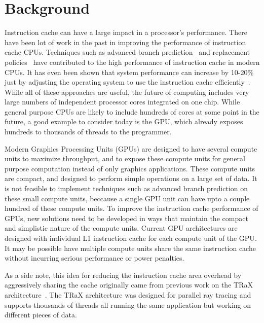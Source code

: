 \section{Background}

Instruction cache can have a large impact in a processor's
performance. 
There have been lot of work in the past in improving the performance
of instruction cache  CPUs. 
Techniques such as advanced branch prediction~\cite{yeh93} and
replacement policies~\cite{smith85} have contributed to the high
performance of instruction cache in modern CPUs. 
It has even been shown that system performance can increase by 10-20\%
just by adjusting the operating system to use the instruction cache
efficiently~\cite{torrellas98}.
While all of these approaches are useful, the future of computing
includes very large numbers of independent processor cores integrated
on one chip.
While general purpose CPUs are likely to include hundreds of cores at
some point in the future, a good example to consider today is the GPU,
which already exposes hundreds to thousands of threads to the
programmer. 

Modern Graphics Processing Units (GPUs) are designed to have several
compute units to maximize throughput, and to expose these compute
units for general purpose computation instead of only graphics
applications.
These compute units are compact, and designed to perform simple
operations on a large set of data. 
It is not feasible to implement techniques such as advanced branch
prediction on these small compute units, beccause a single GPU unit
can have upto a couple hundred of these compute units. 
To improve the instruction cache performance of GPUs, new solutions
need to be developed in ways that maintain the compact and simplistic
nature of the compute units. 
Current GPU architectures are designed with individual L1 instruction
cache for each compute unit of the GPU\cite{keckler11}. 
It may be possible have multiple compute units share the same
instruction cache without incurring serious performance or power
penalties.

As a side note, this idea for reducing the instruction cache area
overhead by aggressively sharing the cache originally came from
previous work on the TRaX architecture~\cite{spjut09,kopta10,spjut12}.
The TRaX architecture was designed for parallel ray tracing and
supports thousands of threads all running the same application but
working on different pieces of data.


